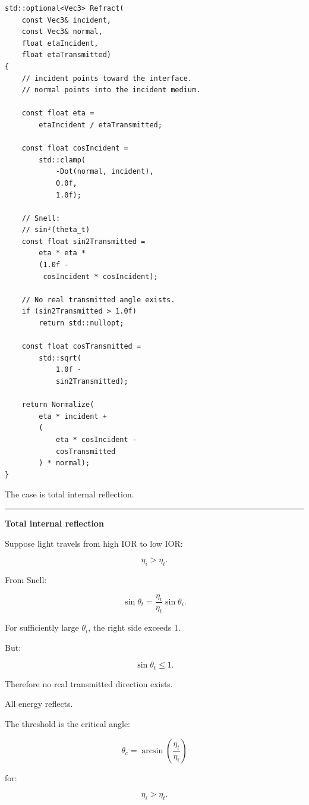 \begin{verbatim}
std::optional<Vec3> Refract(
    const Vec3& incident,
    const Vec3& normal,
    float etaIncident,
    float etaTransmitted)
{
    // incident points toward the interface.
    // normal points into the incident medium.

    const float eta =
        etaIncident / etaTransmitted;

    const float cosIncident =
        std::clamp(
            -Dot(normal, incident),
            0.0f,
            1.0f);

    // Snell:
    // sin²(theta_t)
    const float sin2Transmitted =
        eta * eta *
        (1.0f -
         cosIncident * cosIncident);

    // No real transmitted angle exists.
    if (sin2Transmitted > 1.0f)
        return std::nullopt;

    const float cosTransmitted =
        std::sqrt(
            1.0f -
            sin2Transmitted);

    return Normalize(
        eta * incident +
        (
            eta * cosIncident -
            cosTransmitted
        ) * normal);
}
\end{verbatim}

The  case is total internal reflection.

\begin{center}\rule{0.5\linewidth}{0.5pt}\end{center}

\textbf{Total internal reflection}

Suppose light travels from high IOR to low IOR:

\[
\eta_i>\eta_t.
\]

From Snell:

\[
\sin\theta_t
=
\frac{\eta_i}{\eta_t}
\sin\theta_i.
\]

For sufficiently large \(\theta_i\), the right side exceeds 1.

But:

\[
\sin\theta_t\le1.
\]

Therefore no real transmitted direction exists.

All energy reflects.

The threshold is the critical angle:

\[
\boxed{
\theta_c=
\arcsin
\left(
\frac{\eta_t}{\eta_i}
\right)
}
\]

for:

\[
\eta_i>\eta_t.
\]


